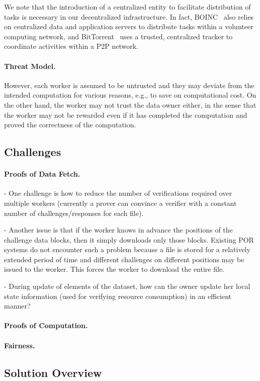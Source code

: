 We note that the introduction of a centralized entity to facilitate distribution of tasks is necessary in our decentralized infrastructure.
In fact, BOINC~\cite{And04} also relies on centralized data and application servers to distribute tasks within a volunteer computing network, and BitTorrent~\cite{Coh03} uses a trusted, centralized tracker to coordinate activities within a P2P network.

\paragraph{Threat Model.}
However, each worker is assumed to be untrusted and they may deviate from the intended computation for various reasons, e.g., to save on computational cost. 
On the other hand, the worker may not trust the data owner either, in the sense that the worker may not be rewarded even if it has completed the computation and proved the correctness of the computation.


\subsection{Challenges} \label{sect:challenges}

\paragraph{Proofs of Data Fetch.}
- One challenge is how to reduce the number of verifications required over multiple workers (currently a prover can convince a verifier with a constant number of challenges/responses for each file). 

- Another issue is that if the worker knows in advance the positions of the challenge data blocks, then it simply downloads only those blocks. Existing POR systems do not encounter such a problem because a file is stored for a relatively extended period of time and different challenges on different positions may be issued to the worker. This forces the worker to download the entire file.

- During update of elements of the dataset, how can the owner update her local state information (used for verifying resource consumption) in an efficient manner?

\paragraph{Proofs of Computation.}


\paragraph{Fairness.}



\subsection{Solution Overview} \label{sect:solution}

